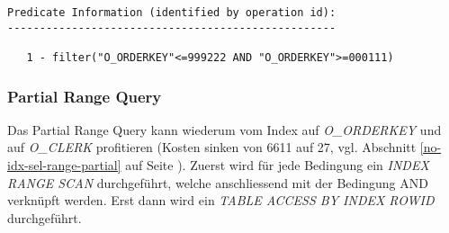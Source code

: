 \documentclass[11pt,a4paper,parskip=half]{scrartcl}
\begin{document}
\begin{lstlisting}
Predicate Information (identified by operation id):                                                                                                                                                                                                                                                          
---------------------------------------------------                                                                                                                                                                                                                                                          
                                                                                                                                                                                                                                                                                                             
   1 - filter("O_ORDERKEY"<=999222 AND "O_ORDERKEY">=000111)                                                                                                                                                                                                                                                 
\end{lstlisting}

\subsubsection{Partial Range Query}
Das Partial Range Query kann wiederum vom Index auf \emph{O\_ORDERKEY} und auf \emph{O\_CLERK} profitieren (Kosten sinken von 6611 auf 27, vgl. Abschnitt \ref{no-idx-sel-range-partial} auf Seite \pageref{no-idx-sel-range-partial}). Zuerst wird für jede Bedingung ein \emph{INDEX RANGE SCAN} durchgeführt, welche anschliessend mit der Bedingung AND verknüpft werden. Erst dann wird ein \emph{TABLE ACCESS BY INDEX ROWID} durchgeführt.
\end{document}
